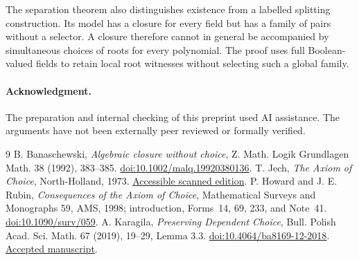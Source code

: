 \documentclass[11pt,a4paper]{article}
\theoremstyle{definition}\newtheorem{definition}[theorem]{Definition}
\theoremstyle{remark}\newtheorem{remark}[theorem]{Remark}
\begin{document}
The separation theorem also distinguishes existence from a labelled splitting construction. Its model has a closure for every field but has a family of pairs without a selector. A closure therefore cannot in general be accompanied by simultaneous choices of roots for every polynomial. The proof uses full Boolean-valued fields to retain local root witnesses without selecting such a global family.

\paragraph{Acknowledgment.} The preparation and internal checking of this preprint used AI assistance. The arguments have not been externally peer reviewed or formally verified.

\begin{thebibliography}{9}
 B. Banaschewski, \emph{Algebraic closure without choice}, Z. Math. Logik Grundlagen Math. 38 (1992), 383--385. \href{https://doi.org/10.1002/malq.19920380136}{doi:10.1002/malq.19920380136}.
 T. Jech, \emph{The Axiom of Choice}, North-Holland, 1973. \href{https://gwern.net/doc/math/1973-jech-theaxiomofchoice.pdf}{Accessible scanned edition}.
 P. Howard and J. E. Rubin, \emph{Consequences of the Axiom of Choice}, Mathematical Surveys and Monographs 59, AMS, 1998; introduction, Forms~14, 69, 233, and Note~41. \href{https://doi.org/10.1090/surv/059}{doi:10.1090/surv/059}.
 A. Karagila, \emph{Preserving Dependent Choice}, Bull. Polish Acad. Sci. Math. 67 (2019), 19--29, Lemma 3.3. \href{https://doi.org/10.4064/ba8169-12-2018}{doi:10.4064/ba8169-12-2018}. \href{https://ueaeprints.uea.ac.uk/69607/1/Accepted_Manuscript.pdf}{Accepted manuscript}.
\end{thebibliography}
\end{document}
